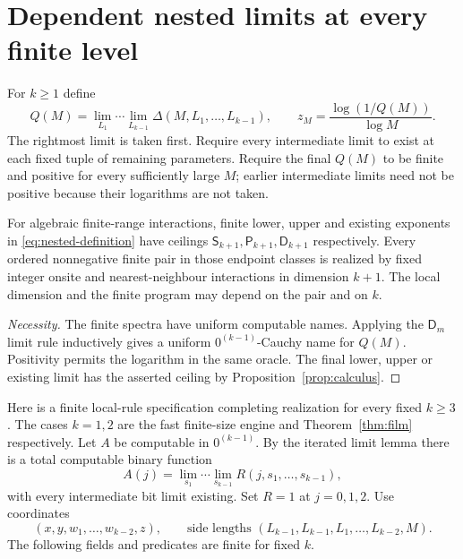 \section{Dependent nested limits at every finite level}\label{sec:nested}
For $k\geq1$ define
\begin{equation}\label{eq:nested-definition}
 Q(M)=\lim_{L_1}\cdots\lim_{L_{k-1}}
       \Delta(M,L_1,\ldots,L_{k-1}),\qquad
 z_M=\frac{\log(1/Q(M))}{\log M}.
\end{equation}
The rightmost limit is taken first. Require every intermediate limit to
exist at each fixed tuple of remaining parameters. Require the final
$Q(M)$ to be finite and positive for every sufficiently large $M$;
earlier intermediate limits need not be positive because their
logarithms are not taken.

\begin{theorem}\label{thm:nested}
For algebraic finite-range interactions, finite lower, upper and
existing exponents in \eqref{eq:nested-definition} have ceilings
$\mathsf S_{k+1},\mathsf P_{k+1},\mathsf D_{k+1}$ respectively.
Every ordered nonnegative finite pair in those endpoint classes is
realized by fixed integer onsite and nearest-neighbour interactions
in dimension $k+1$. The local dimension and the finite program may
depend on the pair and on $k$.
\end{theorem}
\begin{proof}[Necessity]
The finite spectra have uniform computable names. Applying the
$\mathsf D_m$ limit rule inductively gives a uniform
$0^{(k-1)}$-Cauchy name for $Q(M)$. Positivity permits the logarithm
in the same oracle. The final lower, upper or existing limit has the
asserted ceiling by Proposition~\ref{prop:calculus}.
\end{proof}

Here is a finite local-rule specification completing realization for
every fixed $k\geq3$. The cases $k=1,2$ are the fast finite-size
engine and Theorem~\ref{thm:film} respectively. Let $A$ be computable
in $0^{(k-1)}$. By the iterated limit lemma there is a total
computable binary function
\[
 A(j)=\lim_{s_1}\cdots\lim_{s_{k-1}}
 R(j,s_1,\ldots,s_{k-1}),
\]
with every intermediate bit limit existing. Set $R=1$ at $j=0,1,2$.
Use coordinates
\[
 (x,y,w_1,\ldots,w_{k-2},z),\qquad
 \text{side lengths }(L_{k-1},L_{k-1},L_1,\ldots,L_{k-2},M).
\]
The following fields
and predicates are finite for fixed $k$.

